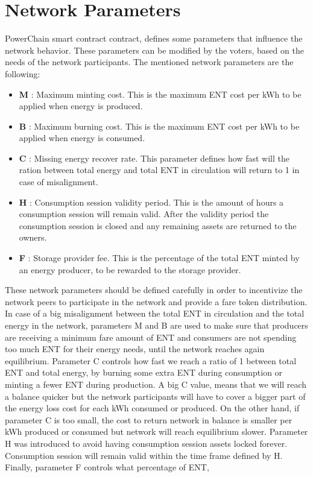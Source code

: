 \section{Network Parameters}
PowerChain smart contract contract, defines some parameters that influence the network behavior. These parameters can be modified by the voters, based on the needs of the network participants. 
The mentioned network parameters are the following:
\begin{itemize}
    \item \textbf{M} : Maximum minting cost. This is the maximum ENT cost per kWh to be applied when energy is produced.
    \item \textbf{B} : Maximum burning cost. This is the maximum ENT cost per kWh to be applied when energy is consumed.
    \item \textbf{C} : Missing energy recover rate. This parameter defines how fast will the ration between total energy and total ENT in circulation will return to 1 in case of misalignment.
    \item \textbf{H} : Consumption session validity period. This is the amount of hours a consumption session will remain valid. After the validity period the consumption session is closed and any remaining assets are returned to the owners.
    \item \textbf{F} : Storage provider fee. This is the percentage of the total ENT minted by an energy producer, to be rewarded to the storage provider.
\end{itemize}
These network parameters should be defined carefully in order to incentivize the network peers to participate in the network and provide a fare token distribution.
In case of a big misalignment between the total ENT in circulation and the total energy in the network, parameters M and B are used to make sure that producers are receiving a minimum fare amount of ENT and consumers are not spending too much ENT for their 
energy needs, until the network reaches again equilibrium. Parameter C controls how fast we reach a ratio of 1 between total ENT and total energy, by burning some extra ENT during consumption or minting a fewer ENT during production. A big C value, means that 
we will reach a balance quicker but the network participants will have to cover a bigger part of the energy loss cost for each kWh consumed or produced. On the other hand, if parameter C is too small, the cost to return network in balance is smaller per kWh produced or
consumed but network will reach equilibrium slower. Parameter H was introduced to avoid having consumption session assets locked forever. Consumption session will remain valid within the time frame defined by H. Finally, parameter F controls what percentage of ENT, 
